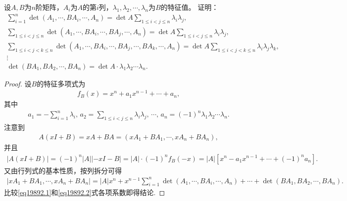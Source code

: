 \documentclass[../../main.tex]{subfiles}%
\begin{document}
\begin{example}
设\( A,B \)为\( n \)阶矩阵，\( A_i \)为\( A \)的第\( i \)列，\( \lambda_1,\lambda_2,\cdots,\lambda_n \)为\( B \)的特征值。
证明：
\begin{gather*}
\sum_{i=1}^n{\det \left( A_1,\cdots ,BA_i,\cdots ,A_n \right)}=\det A\sum_{1\leqslant i<j\leqslant n}{\lambda _i\lambda _j},
\\
\sum_{1\leqslant i<j\leqslant n}{\det \left( A_1,\cdots ,BA_i,\cdots ,BA_j,\cdots ,A_n \right)}=\det A\sum_{1\leqslant i<j\leqslant n}{\lambda _i\lambda _j},
\\
\sum_{1\leqslant i<j<k\leqslant n}{\det \left( A_1,\cdots ,BA_i,\cdots ,BA_j,\cdots ,BA_k,\cdots ,A_n \right)}=\det A\sum_{1\leqslant i<j<k\leqslant n}{\lambda _i\lambda _j\lambda _k},
\\
\vdots 
\\
\det \left( BA_1,BA_2,\cdots ,BA_n \right) =\det A\cdot \lambda _1\lambda _2\cdots \lambda _n.
\end{gather*}
\end{example}
\begin{proof}

设\( B \)的特征多项式为
\begin{align*}
f_B(x) = x^n + a_1x^{n-1} + \cdots + a_n,
\end{align*}
其中
\begin{align*}
a_1 = -\sum_{i=1}^n \lambda_i,\, a_2 = \sum_{1 \leqslant i < j \leqslant n} \lambda_i\lambda_j,\, \cdots,\, a_n = (-1)^n \lambda_1\lambda_2\cdots\lambda_n.
\end{align*}
注意到
\begin{align*}
A(xI + B) = xA + BA = (xA_1 + BA_1, \cdots, xA_n + BA_n),
\end{align*}
并且
\begin{align}
|A(xI + B)| = (-1)^n |A| |-xI - B| = |A| \cdot (-1)^n f_B(-x) = |A| \left[ x^n - a_1x^{n-1} + \cdots + (-1)^n a_n \right]. \label{eq19892.1}
\end{align}
又由行列式的基本性质，按列拆分可得
\begin{align}
|xA_1 + BA_1, \cdots, xA_n + BA_n| = |A|x^n + x^{n-1} \sum_{i=1}^n \det(A_1, \cdots, BA_i, \cdots, A_n) + \cdots + \det(BA_1, BA_2, \cdots, BA_n). \label{eq19892.2}
\end{align}
比较\eqref{eq19892.1}和\eqref{eq19892.2}式各项系数即得结论.

\end{proof}
\end{document}
